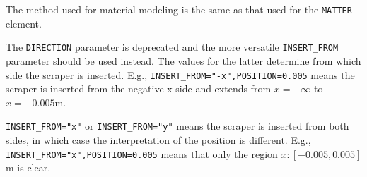 The method used for material modeling is the same as that used for the \verb|MATTER| element.

The \verb|DIRECTION| parameter is deprecated and the more versatile \verb|INSERT_FROM| parameter
should be used instead.
The values for the latter determine from which side the scraper is inserted.
E.g., \verb|INSERT_FROM="-x",POSITION=0.005| means the scraper is inserted from the negative x side
and extends from $x=-\infty$ to $x=-0.005$m.

\verb|INSERT_FROM="x"| or \verb|INSERT_FROM="y"| means the scraper is inserted from both sides, in which case the interpretation
of the position is different. 
E.g., \verb|INSERT_FROM="x",POSITION=0.005| means that only the region $x:[-0.005, 0.005]$m is clear.
